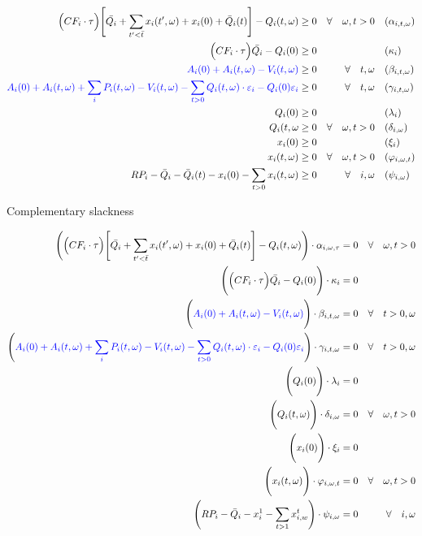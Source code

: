 \documentclass[11pt, letterpaper]{article}
\newcommand{\pia}{\textcolor[rgb]{0,0,1}}
\begin{document}
\begin{align}
    \Big(CF_i \cdot\tau\Big)  \Bigg[\bar{Q_i} + \sum_{t^{\prime}<\bar{t}} x_i(t^\prime,\omega) + x_i(0)+ \bar{Q}_i(t) \Bigg] - Q_i(t,\omega) & \geq 0  & \forall  \quad \omega, t  > 0 & \quad (\alpha_{i,t,\omega}) \\
    \Big(CF_i\cdot\tau \Big)\bar{Q_i}-Q_{i}(0) & \geq 0  &  \quad & \quad (\kappa_i) \\
\pia{ A_{i}(0)+A_i(t,\omega) - V_i(t,\omega) } & \geq  0  & \forall  \quad t,\omega & \quad (\beta_{i,t,\omega})\\
  \pia{ A_{i}(0)+A_i(t,\omega) + \sum_{i}P_i(t,\omega) - V_i(t,\omega)-\sum_{t>0}Q_i(t, \omega)\cdot \varepsilon_{i}-Q_i(0)\varepsilon_{i}} & \geq  0  &\forall \quad t,\omega & \quad (\gamma_{i,t,\omega})\\
 Q_i(0) & \geq  0 & \quad & \quad (\lambda_i)\\
 Q_i(t, \omega & \geq  0   & \forall  \quad \omega, t >0 & \quad (\delta_{i,\omega})\\
  x_i(0) & \geq  0 & \quad & \quad (\xi_i)\\
  x_i(t, \omega) & \geq  0   & \forall  \quad \omega, t >0 & \quad (\varphi_{i,\omega,t})\\
 RP_i - \bar{Q}_i - \bar{Q}_i(t) - x_i(0) - \sum_{t > 0} x_i(t,\omega)  &  \geq 0 &  \forall \quad i,\omega &  \quad (\psi_{i,\omega}) 
  \end{align}
  \begin{flushleft}
Complementary slackness
\end{flushleft}

\begin{align}
    \Bigg(\Big(CF_i \cdot\tau\Big)  \Bigg[\bar{Q_i} + \sum_{t^{\prime}<\bar{t}} x_i(t^\prime,\omega) + x_i(0)+ \bar{Q}_i(t) \Bigg] - Q_i(t,\omega)\Bigg) \cdot \alpha_{i,\omega,\tau} & = 0 & \forall  \quad \omega, t  > 0\\
    \Bigg(  \Big(CF_i\cdot\tau \Big)\bar{Q_i}-Q_{i}(0) \Bigg)\cdot \kappa_i & = 0  & \quad  \\
    \Bigg( \pia{ A_{i}(0)+A_i(t,\omega) - V_i(t,\omega) } \Bigg) \cdot \beta_{i,t,\omega} & = 0 & \forall  \quad t>0 ,\omega\\
    \Bigg(  \pia{ A_{i}(0)+A_i(t,\omega) + \sum_{i}P_i(t,\omega) - V_i(t,\omega)-\sum_{t>0}Q_i(t, \omega)\cdot \varepsilon_{i}-Q_i(0)\varepsilon_{i}} \Bigg)\cdot \gamma_{i,t,\omega} & = 0 & \forall \quad t>0, \omega \\
    \Bigg( Q_i(0) \Bigg) \cdot \lambda_i & = 0 & \\
    \Bigg(Q_i(t,\omega)\Bigg ) \cdot \delta_{i,\omega} & = 0 & \forall  \quad \omega, t >0\\
    \Bigg( x_i(0) \Bigg) \cdot \xi_i & = 0 & \\
    \Bigg( x_i(t,\omega) \Bigg) \cdot \varphi_{i,\omega,t} & = 0 & \forall  \quad \omega, t >0 \\
    \Bigg(RP_i - \bar{Q}_i - x^{1}_i - \sum_{t>1} x^{t}_{i,w}  \Bigg) \cdot \psi_{i,\omega}&  = 0 &  \forall \quad i,\omega 
\end{align}
\end{document}
